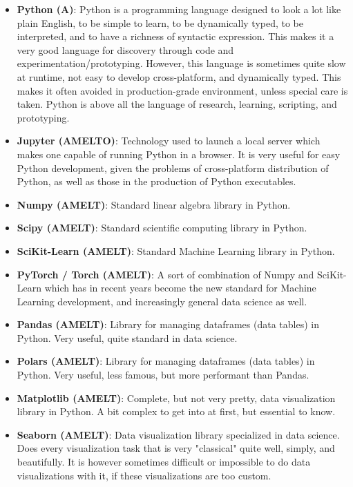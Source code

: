 \documentclass{article}
\begin{document}
\begin{itemize}

	\item \textbf{Python (A)}: Python is a programming language designed to look a lot like plain English, to be simple to learn, to be dynamically typed, to be interpreted, and to have a richness of syntactic expression. This makes it a very good language for discovery through code and experimentation/prototyping. However, this language is sometimes quite slow at runtime, not easy to develop cross-platform, and dynamically typed. This makes it often avoided in production-grade environment, unless special care is taken. Python is above all the language of research, learning, scripting, and prototyping.

	\item \textbf{Jupyter (AMELTO)}: Technology used to launch a local server which makes one capable of running Python in a browser. It is very useful for easy Python development, given the problems of cross-platform distribution of Python, as well as those in the production of Python executables.

	\item \textbf{Numpy (AMELT)}: Standard linear algebra library in Python.

	\item \textbf{Scipy (AMELT)}: Standard scientific computing library in Python.

	\item \textbf{SciKit-Learn (AMELT)}: Standard Machine Learning library in Python.

	\item \textbf{PyTorch / Torch (AMELT)}: A sort of combination of Numpy and SciKit-Learn which has in recent years become the new standard for Machine Learning development, and increasingly general data science as well.

	\item \textbf{Pandas (AMELT)}: Library for managing dataframes (data tables) in Python. Very useful, quite standard in data science.

	\item \textbf{Polars (AMELT)}: Library for managing dataframes (data tables) in Python. Very useful, less famous, but more performant than Pandas.

	\item \textbf{Matplotlib (AMELT)}: Complete, but not very pretty, data visualization library in Python. A bit complex to get into at first, but essential to know.

	\item \textbf{Seaborn (AMELT)}: Data visualization library specialized in data science. Does every visualization task that is very "classical" quite well, simply, and beautifully. It is however sometimes difficult or impossible to do data visualizations with it, if these visualizations are too custom.

\end{itemize}
\end{document}
